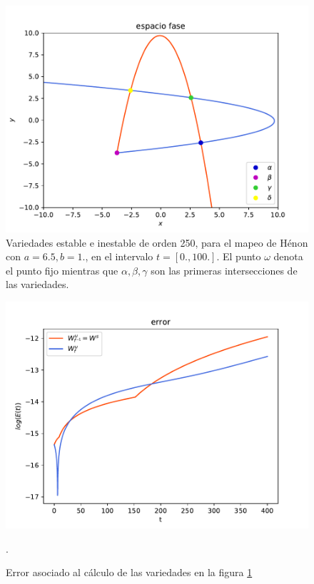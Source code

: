 \begin{figure}[H]
\centering
\includegraphics[scale=0.7]{rectangulo_fundamental}
\caption{Variedades estable e inestable de orden 250, para el mapeo de Hénon con $a=6.5,b=1.$, en el intervalo $t=[0.,100.]$. El punto $\omega$ denota el punto fijo mientras que $\alpha, \beta, \gamma$ son las primeras intersecciones de las variedades.}
\label{rectangulo0}
\end{figure}

\begin{figure}[H]
\centering
\includegraphics[scale=0.7]{error_rectangulo}
\caption{Error asociado al cálculo de las variedades en la figura \ref{rectangulo0}}.
\label{ErrorRectangulo0}
\end{figure} 

